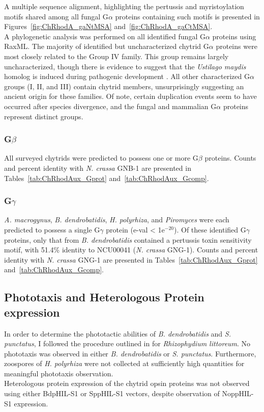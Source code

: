 \indent A multiple sequence alignment, highlighting the pertussis and myristoylation motifs shared among all fungal G$\alpha$ proteins containing such motifs is presented in Figures~\ref{fig:ChRhodA_gaNtMSA} and~\ref{fig:ChRhodA_gaCtMSA}.\\
\indent A phylogenetic analysis was performed on all identified fungal G$\alpha$ proteins using RaxML. The majority of identified but uncharacterized chytrid G$\alpha$ proteins were most closely related to the Group IV family. This group remains largely uncharacterized, though there is evidence to suggest that the \textit{Ustilago maydis} homolog is induced during pathogenic development \cite{Bolker1998}. All other characterized G$\alpha$ groups (I, II, and III) contain chytrid members, unsurprisingly suggesting an ancient origin for these families. Of note, certain duplication events seem to have occurred after species divergence, and the fungal and mammalian G$\alpha$ proteins represent distinct groups.\\
\subsubsection*{G$\beta$}
All surveyed chytrids were predicted to possess one or more G$\beta$ proteins. Counts and percent identity with \textit{N. crassa} GNB-1 are presented in Tables~\ref{tab:ChRhodAux_Gprot} and~\ref{tab:ChRhodAux_Gcomp}.
\subsubsection*{G$\gamma$}
\textit{A. macrogynus}, \textit{B. dendrobatidis}, \textit{H. polyrhiza}, and \textit{Piromyces} were each predicted to possess a single G$\gamma$ protein (e-val < 1e$^{-20}$). Of these identified G$\gamma$ proteins, only that from \textit{B. dendrobatidis} contained a pertussis toxin sensitivity motif, with 51.4\% identity to NCU00041 (\textit{N. crassa} GNG-1). Counts and percent identity with \textit{N. crassa} GNG-1 are presented in Tables~\ref{tab:ChRhodAux_Gprot} and~\ref{tab:ChRhodAux_Gcomp}.
\subsection*{Phototaxis and Heterologous Protein expression}
In order to determine the phototactic abilities of \textit{B. dendrobatidis} and \textit{S. punctatus}, I followed the procedure outlined in \cite{Muehlstein1987} for \textit{Rhizophydium littoreum}. No phototaxis was observed in either \textit{B. dendrobatidis} or \textit{S. punctatus}. Furthermore, zoospores of \textit{H. polyrhiza} were not collected at sufficiently high quantities for meaningful phototaxis observation.\\
\indent Heterologous protein expression of the chytrid opsin proteins was not observed using either BdpHIL-S1 or SppHIL-S1 vectors, despite observation of NoppHIL-S1 expression.\\ 
